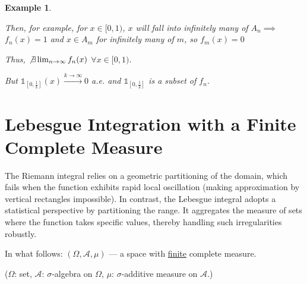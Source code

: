 \documentclass[12pt]{article}
\theoremstyle{blueplain}
\theoremstyle{bluedef}
\theoremstyle{blueremark}
\newtheorem{example}{Example}[section]
\numberwithin{equation}{section}
\begin{document}
\begin{example}
\begin{center}
  \end{center}

  Then, for example, for $x \in [0, 1)$, $x$ will fall into infinitely many of $A_n \implies$ $f_n(x) = 1$ and $x \in A_m$ for infinitely many of $m$, so $f_m(x) = 0$

  Thus, $\not\exists \lim_{n \to \infty} f_n(x)$ $\forall x \in [0, 1)$.

  But $\mathds{1}_{[0,\frac{1}{k}]}(x) \overset{k \to \infty}{\rightarrow} 0$ a.e. and $\mathds{1}_{[0,\frac{1}{k}]}$ is a subset of $f_n$.
\end{example}

\clearpage

\section{Lebesgue Integration with a Finite Complete Measure}

The Riemann integral relies on a geometric partitioning of the domain, which fails when the function exhibits rapid local oscillation (making approximation by vertical rectangles impossible). In contrast, the Lebesgue integral adopts a statistical perspective by partitioning the range. It aggregates the measure of sets where the function takes specific values, thereby handling such irregularities robustly.

\vspace{1cm}

\noindent In what follows: $(\Omega, \mathcal{A}, \mu)$ --- a space with \underline{finite} complete measure.

\noindent ($\Omega$: set, $\mathcal{A}$: $\sigma$-algebra on $\Omega$, $\mu$: $\sigma$-additive measure on $\mathcal{A}$.)
\end{document}
